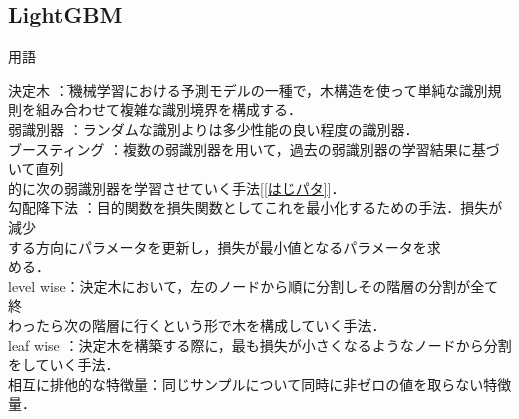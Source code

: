 \documentclass[dvipdfmx]{jreport}
\begin{document}
\subsection{LightGBM}
\begin{itembox}[l]{\large{用語}}
    \begin{tabbing}
        \hspace{15pt} \raisebox{0.5ex}{\tiny $\bullet$} 決定木 \hspace{66pt}\=：機械学習における予測モデルの一種で，木構造を使って単純な識別規\\[0.5em]\>\hspace{6.5pt}則を組み合わせて複雑な識別境界を構成する．\\[0.5em]
        \hspace{15pt} \raisebox{0.5ex}{\tiny $\bullet$} 弱識別器 \> ：ランダムな識別よりは多少性能の良い程度の識別器．\\[0.5em]
        \hspace{15pt} \raisebox{0.5ex}{\tiny $\bullet$} ブースティング \>：複数の弱識別器を用いて，過去の弱識別器の学習結果に基づいて直列\\[0.5em]\>\hspace{6.5pt}的に次の弱識別器を学習させていく手法[\ref{はじパタ}]．\\[0.5em]
        \hspace{15pt} \raisebox{0.5ex}{\tiny $\bullet$} 勾配降下法 \>：目的関数を損失関数としてこれを最小化するための手法．損失が減少\\[0.5em]\>\hspace{6.5pt}する方向にパラメータを更新し，損失が最小値となるパラメータを求\\[0.5em]\>\hspace{6.5pt}める．\\[0.5em]
        \hspace{15pt} \raisebox{0.5ex}{\tiny $\bullet$} level wise\>：決定木において，左のノードから順に分割しその階層の分割が全て終\\[0.5em]\>\hspace{6.5pt}わったら次の階層に行くという形で木を構成していく手法．\\[0.5em]
        \hspace{15pt} \raisebox{0.5ex}{\tiny $\bullet$} leaf wise \>：決定木を構築する際に，最も損失が小さくなるようなノードから分割\\[0.5em]\>\hspace{6.5pt}をしていく手法．\\[0.5em]
        \hspace{15pt} \raisebox{0.5ex}{\tiny $\bullet$} 相互に排他的な特徴量\>：同じサンプルについて同時に非ゼロの値を取らない特徴量．
    \end{tabbing}
\end{itembox}
\end{document}
